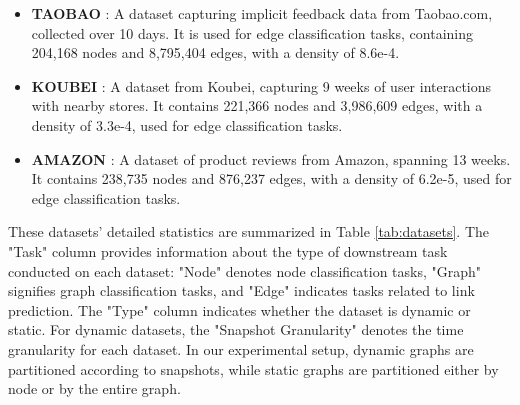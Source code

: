 \begin{itemize}
    \item \textbf{TAOBAO} : A dataset capturing implicit feedback data from Taobao.com, collected over 10 days. It is used for edge classification tasks, containing 204,168 nodes and 8,795,404 edges, with a density of 8.6e-4.
    \item \textbf{KOUBEI} : A dataset from Koubei, capturing 9 weeks of user interactions with nearby stores. It contains 221,366 nodes and 3,986,609 edges, with a density of 3.3e-4, used for edge classification tasks.
    \item \textbf{AMAZON} : A dataset of product reviews from Amazon, spanning 13 weeks. It contains 238,735 nodes and 876,237 edges, with a density of 6.2e-5, used for edge classification tasks.
\end{itemize}
These datasets’ detailed statistics are summarized in Table \ref{tab:datasets}. The "Task" column provides information about the type of downstream task conducted on each dataset: "Node" denotes node classification tasks, "Graph" signifies graph classification tasks, and "Edge" indicates tasks related to link prediction. The "Type" column indicates whether the dataset is dynamic or static. For dynamic datasets, the "Snapshot Granularity" denotes the time granularity for each dataset. In our experimental setup, dynamic graphs are partitioned according to snapshots, while static graphs are partitioned either by node or by the entire graph.


